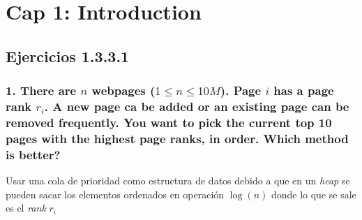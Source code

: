 \documentclass{article}
\begin{document}
\section{Cap 1: Introduction}

\subsection{Ejercicios 1.3.3.1}

\subsubsection{1. There are $n$ webpages ($1 \leq n \leq 10M $). Page $i$ has a page rank $r_{i}$. A new page ca be added or an existing page can be removed frequently. You want to pick the current top 10 pages with the highest page ranks, in order. Which method is better? }

Usar una cola de prioridad como estructura de datos debido a que en un \textit{heap} se pueden sacar los elementos ordenados en operación $\log(n)$ donde lo que se sale es el \textit{rank} $r_{i}$ 
\end{document}
